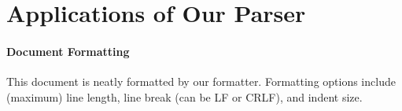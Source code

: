 \documentclass{article}
\begin{document}
\section{Applications of Our Parser}
 \label{sec:apply}
\paragraph*{Document Formatting} This document is neatly formatted by our
formatter. Formatting options include (maximum) line length, line break (can be
LF or CRLF), and indent size.
\end{document}
